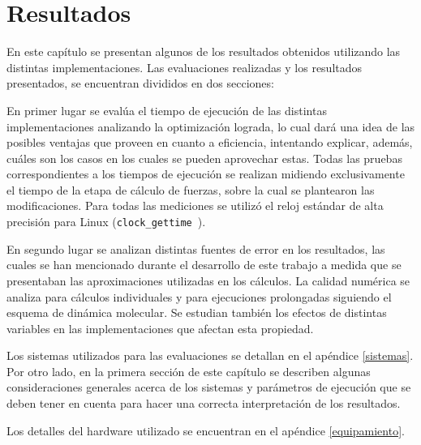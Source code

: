 \chapter{Resultados}
En este capítulo se presentan algunos de los resultados obtenidos utilizando las distintas implementaciones.
Las evaluaciones realizadas y los resultados presentados, se encuentran divididos en dos secciones:

En primer lugar se evalúa el tiempo de ejecución de las distintas implementaciones analizando la optimización lograda, lo cual dará una idea de las posibles ventajas que proveen en cuanto a eficiencia, 
intentando explicar, además, cuáles son los casos en los cuales se pueden aprovechar estas.
Todas las pruebas correspondientes a los tiempos de ejecución se realizan midiendo exclusivamente el tiempo de la etapa de cálculo de fuerzas, sobre la cual se plantearon las modificaciones.
Para todas las mediciones se utilizó el reloj est\'andar de alta precisi\'on para Linux (\texttt{clock\_gettime}~\cite{LinuxDocumentation}). 

En segundo lugar se analizan distintas fuentes de error en los resultados, las cuales se han mencionado durante el desarrollo de este trabajo a medida que se presentaban las aproximaciones utilizadas en los cálculos. 
La calidad numérica se analiza para cálculos individuales y para ejecuciones prolongadas siguiendo el esquema de dinámica molecular.
Se estudian también los efectos de distintas variables en las implementaciones que afectan esta propiedad.

Los sistemas utilizados para las evaluaciones se detallan en el apéndice \ref{sistemas}. 
Por otro lado, en la primera sección de este capítulo se describen algunas consideraciones generales acerca de los sistemas y parámetros de ejecución que se deben tener en cuenta para hacer una correcta interpretación de los resultados.

Los detalles del hardware utilizado se encuentran en el apéndice \ref{equipamiento}. 


% 
% 
% 

